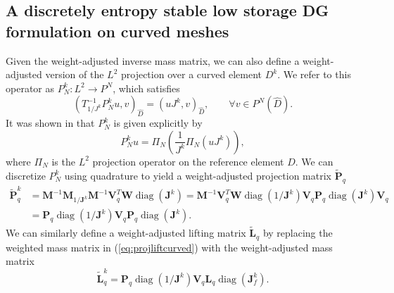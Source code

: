 \documentclass[preprint,10pt]{article}
\theoremstyle{definition}
\theoremstyle{lemma}
\theoremstyle{theorem}
\theoremstyle{assumption}
\DeclareMathOperator{\diag}{diag}
\renewcommand{\hat}{\widehat}
\renewcommand{\tilde}{\widetilde}
\newcommand{\LRp}[1]{\left( #1 \right)}
\begin{document}
{\subsection{A discretely entropy stable low storage DG formulation on curved meshes}

Given the weight-adjusted inverse mass matrix, we can also define a weight-adjusted version of the $L^2$ projection over a curved element $D^k$.  We refer to this operator as $P^k_N: L^2\rightarrow P^N$, which satisfies
\[
\LRp{T^{-1}_{1/J^k}P^k_N u,v}_{\hat{D}} = \LRp{uJ^k,v}_{\hat{D}}, \qquad \forall v\in P^N\LRp{\hat{D}}.
\]
It was shown in \cite{chan2016weight2} that $P_N^k $ is given explicitly by
\begin{equation}
P^k_N u = \Pi_N\LRp{\frac{1}{J^k}\Pi_N\LRp{uJ^k}},
\label{eq:wadgproj}
\end{equation}
where $\Pi_N$ is the $L^2$ projection operator on the reference element $\hat{D}$.  We can discretize $P^k_N$ using quadrature to yield a weight-adjusted projection matrix $\tilde{\bm{P}}_q$ 
\begin{align}
\tilde{\bm{P}}^k_q &= \bm{M}^{-1}\bm{M}_{1/\bm{J}^k}\bm{M}^{-1}\bm{V}_q^T\bm{W}\diag\LRp{\bm{J}^k} = \bm{M}^{-1}\bm{V}_q^T\bm{W}\diag\LRp{1/\bm{J}^k} \bm{V}_q\bm{P}_q\diag\LRp{\bm{J}^k} \bm{V}_q \nonumber\\
&= \bm{P}_q \diag\LRp{{1}/{\bm{J}^k}} \bm{V}_q\bm{P}_q \diag\LRp{\bm{J}^k}.
\label{eq:wadgproj}
\end{align}
We can similarly define a weight-adjusted lifting matrix $\tilde{\bm{L}}_q$ by replacing the weighted mass matrix in (\ref{eq:projliftcurved}) with the weight-adjusted mass matrix
\begin{equation}
\tilde{\bm{L}}^k_q = \bm{P}_q \diag\LRp{{1}/{\bm{J}^k}} \bm{V}_q\bm{L}_q \diag\LRp{\bm{J}^k_f}.
\label{eq:wadglift}
\end{equation}

}
\end{document}
